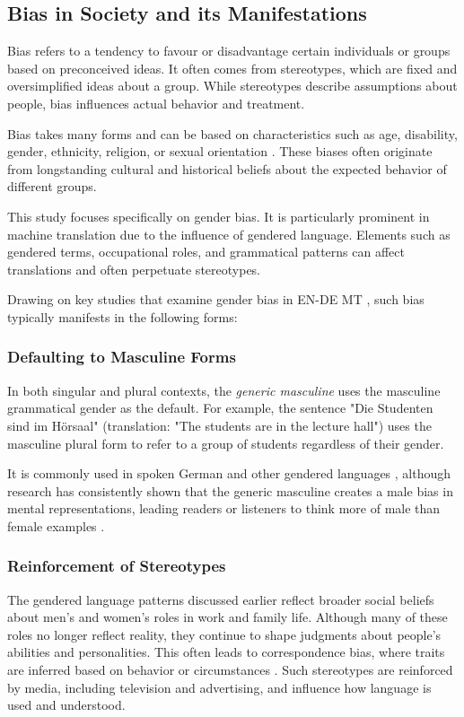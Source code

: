 \subsection{Bias in Society and its Manifestations}
\label{subsection:manifestations_of_gb}
    Bias refers to a tendency to favour or disadvantage certain individuals or groups based on preconceived ideas. It often comes from stereotypes, which are fixed and oversimplified ideas about a group. While stereotypes describe assumptions about people, bias influences actual behavior and treatment.

    Bias takes many forms and can be based on characteristics such as age, disability, gender, ethnicity, religion, or sexual orientation \parencite{ullmannGenderBiasMachine2022}. These biases often originate from longstanding cultural and historical beliefs about the expected behavior of different groups.

    This study focuses specifically on gender bias. It is particularly prominent in machine translation due to the influence of gendered language. Elements such as gendered terms, occupational roles, and grammatical patterns can affect translations and often perpetuate stereotypes.
    
    Drawing on key studies that examine gender bias in EN-DE MT \parencite{ullmannGenderBiasMachine2022,rescignoGenderBiasMachine2023,lardelliBuildingBridgesDataset2024,kapplAreAllSpanish2025}, such bias typically manifests in the following forms:

    \subsubsection{Defaulting to Masculine Forms}
        In both singular and plural contexts, the \textit{generic masculine} uses the masculine grammatical gender as the default.
        For example, the sentence "Die Studenten sind im Hörsaal" (translation: "The students are in the lecture hall") uses the masculine plural form to refer to a group of students regardless of their gender.

        It is commonly used in spoken German and other gendered languages \parencite{lardelliBuildingBridgesDataset2024,schmitzGermanAllProfessors2022}, although research has consistently shown that the generic masculine creates a male bias in mental representations, leading readers or listeners to think more of male than female examples \parencite{sczesnyCanGenderFairLanguage2016}. 

    \subsubsection{Reinforcement of Stereotypes}
        The gendered language patterns discussed earlier reflect broader social beliefs about men’s and women’s roles in work and family life. Although many of these roles no longer reflect reality, they continue to shape judgments about people’s abilities and personalities. This often leads to correspondence bias, where traits are inferred based on behavior or circumstances \parencite{godsilEffectsGenderRoles2016}. Such stereotypes are reinforced by media, including television and advertising, and influence how language is used and understood.

